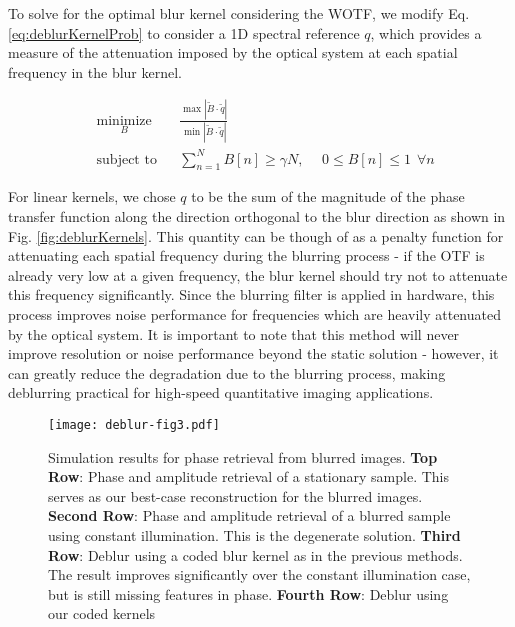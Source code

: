 To solve for the optimal blur kernel considering the WOTF, we modify Eq. \ref{eq:deblurKernelProb} to consider a 1D spectral reference $q$, which provides a measure of the attenuation imposed by the optical system at each spatial frequency in the blur kernel.

\begin{equation}
\begin{aligned}
& \underset{B}{\text{minimize}}
& & \frac{\max{|\tilde{B}\cdot \tilde{q}|}}{\min{|\tilde{B}\cdot \tilde{q}|}}\\
& \text{subject to}
& & \sum_{n=1}^N B[n] \geq \gamma N, \hspace{15pt} 0 \leq B[n] \leq 1 \hspace{5pt} \forall n
\end{aligned}
\end{equation}

For linear kernels, we chose $q$ to be the sum of the magnitude of the phase transfer function along the direction orthogonal to the blur direction as shown in Fig. \ref{fig:deblurKernels}. This quantity can be though of as a penalty function for attenuating each spatial frequency during the blurring process - if the OTF is already very low at a given frequency, the blur kernel should try not to attenuate this frequency significantly. Since the blurring filter is applied in hardware, this process improves noise performance for frequencies which are heavily attenuated by the optical system. It is important to note that this method will never improve resolution or noise performance beyond the static solution - however, it can greatly reduce the degradation due to the blurring process, making deblurring practical for high-speed quantitative imaging applications.

\begin{figure}[ph]
\centering
\texttt{[image: deblur-fig3.pdf]}
\caption{\label{fig:deblurSimulation}
Simulation results for phase retrieval from blurred images. \textbf{Top Row}: Phase and amplitude retrieval of a stationary sample. This serves as our best-case reconstruction for the blurred images. \textbf{Second Row}: Phase and amplitude retrieval of a blurred sample using constant illumination. This is the degenerate solution. \textbf{Third Row}: Deblur using a coded blur kernel as in the previous methods. The result improves significantly over the constant illumination case, but is still missing features in phase. \textbf{Fourth Row}: Deblur using our coded kernels}
\end{figure}

